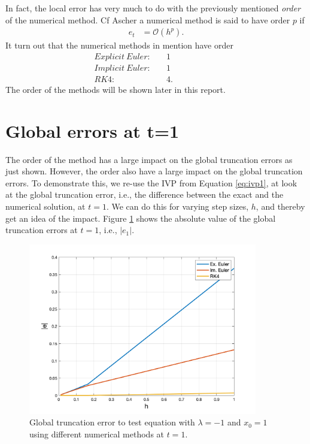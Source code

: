In fact, the local error has very much to do with the previously mentioned \textit{order} of the numerical method. Cf Ascher\cite{Ascher} a numerical method is said to have order $p$ if
\begin{align}
    e_t &= \mathcal{O}(h^p).
\end{align}
It turn out that the numerical methods in mention have order
\begin{align*}
    Explicit \ Euler:& \quad 1 \quad\quad\quad &&& \\
    Implicit \ Euler:& \quad 1 \quad\quad\quad &&& \\
    RK4:& \quad 4. \quad\quad\quad &&&
\end{align*}
The order of the methods will be shown later in this report.

\section{Global errors at t=1}
The order of the method has a large impact on the global truncation errors as just shown. However, the order also have a large impact on the global truncation errors. To demonstrate this, we re-use the IVP from Equation \ref{eq:ivp1}, at look at the global truncation error, i.e., the difference between the exact and the numerical solution, at $t=1$. We can do this for varying step sizes, $h$, and thereby get an idea of the impact. Figure \ref{fig1:err_t1} shows the absolute value of the global truncation errors at $t=1$, i.e., $|e_1|$. 

\begin{figure}[H]
    \centering
    \includegraphics[width=10cm]{graphics/opg1/err_t1.png}
    \caption{Global truncation error to test equation with $\lambda=-1$ and $x_0=1$ using different numerical methods at $t=1$.}
    \label{fig1:err_t1}
\end{figure}

